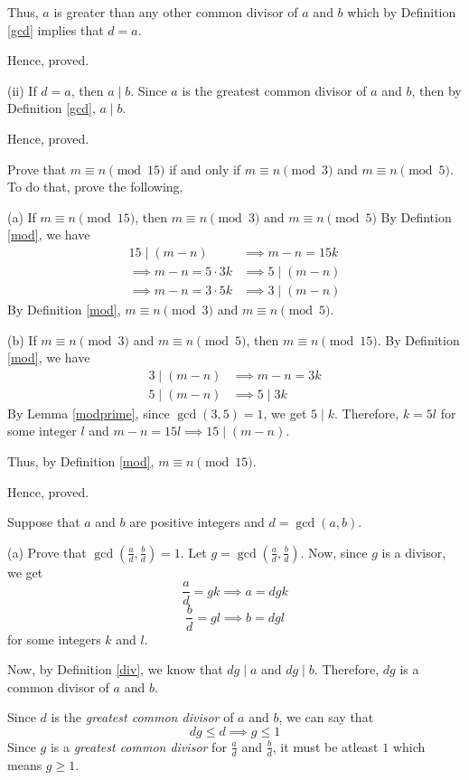 		Thus, $a$ is greater than any other common divisor of $a$ and $b$ which by Definition \ref{gcd} implies that $d = a$.

		Hence, proved.
	\es

	(ii) If $d = a$, then $a \mid b$.
	\bs
		Since $a$ is the greatest common divisor of $a$ and $b$, then by Definition \ref{gcd}, $a \mid b$.

		Hence, proved.
	\es

\ep 

\bp 
	Prove that $m \equiv n \pmod{15}$ if and only if $m \equiv n \pmod{3}$ and $m \equiv n \pmod{5}$. To do that, prove the following,

	\bigbreak
	(a) If $m \equiv n \pmod{15}$, then $m \equiv n \pmod{3}$ and $m \equiv n \pmod{5}$
	\bs
		By Defintion \ref{mod}, we have 
		\begin{align}
			15 \mid (m-n) &\implies m-n = 15k \\
			\implies m-n = 5 \cdot 3k &\implies 5 \mid (m-n) \\
			\implies m-n = 3 \cdot 5k &\implies 3 \mid (m-n)
		\end{align}
		By Definition \ref{mod}, $m \equiv n \pmod{3}$ and $m \equiv n \pmod{5}$.
	\es

	(b) If $m \equiv n \pmod{3}$ and $m \equiv n \pmod{5}$, then $m \equiv n \pmod{15}$.
	\bs
		By Definition \ref{mod},  we have
		\begin{align}
			3 \mid (m-n) &\implies m - n = 3k \\
			5 \mid (m-n) &\implies 5 \mid 3k
		\end{align}
		By Lemma \ref{modprime}, since $\gcd(3,5)=1$, we get $5 \mid k$. Therefore, $k = 5l$ for some integer $l$ and $m-n = 15l \implies 15 \mid (m-n)$.

		Thus, by Definition \ref{mod}, $m \equiv n \pmod{15}$.

		Hence, proved.
	\es
\ep 


\bp 
	Suppose that $a$ and $b$ are positive integers and $d = \gcd(a, b)$.

	\bigbreak
	(a) Prove that $\gcd(\frac{a}{d}, \frac{b}{d}) = 1$.
	\bs
		Let $g = \gcd(\frac{a}{d}, \frac{b}{d})$. Now, since $g$ is a divisor, we get
		$$\frac{a}{d} = gk \implies a = dgk$$
		$$\frac{b}{d} = gl \implies b = dgl$$
		for some integers $k$ and $l$.

		Now, by Definition \ref{div}, we know that $dg \mid a$ and $dg \mid b$. Therefore, $dg$ is a common divisor of $a$ and $b$.

		Since $d$ is the \emph{greatest common divisor} of $a$ and $b$, we can say that 
		$$dg \leq d \implies g \leq 1$$
		Since $g$ is a \emph{greatest common divisor} for $\frac{a}{d}$ and $\frac{b}{d}$, it must be atleast $1$ which means $g \geq 1$.

